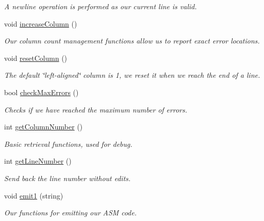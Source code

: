 \begin{DoxyCompactItemize}
\begin{DoxyCompactList}\small\item\em A newline operation is performed as our current line is valid. \item\end{DoxyCompactList}\item 
void \hyperlink{classAdmin_a89653dd68c51b51d9003a2518a56175f}{increaseColumn} ()
\begin{DoxyCompactList}\small\item\em Our column count management functions allow us to report exact error locations. \item\end{DoxyCompactList}\item 
void \hyperlink{classAdmin_a62813e5c17636eeef43524ad40cdaab8}{resetColumn} ()
\begin{DoxyCompactList}\small\item\em The default \char`\"{}left-\/aligned\char`\"{} column is 1, we reset it when we reach the end of a line. \item\end{DoxyCompactList}\item 
bool \hyperlink{classAdmin_af5cd211ee7891ec1fec719bace4b678b}{checkMaxErrors} ()
\begin{DoxyCompactList}\small\item\em Checks if we have reached the maximum number of errors. \item\end{DoxyCompactList}\item 
int \hyperlink{classAdmin_a576e2dfe10f528ad5f1816e673ed2e32}{getColumnNumber} ()
\begin{DoxyCompactList}\small\item\em Basic retrieval functions, used for debug. \item\end{DoxyCompactList}\item 
int \hyperlink{classAdmin_a1a33282a2d64fa3dd9b3e8ac1a4799e3}{getLineNumber} ()
\begin{DoxyCompactList}\small\item\em Send back the line number without edits. \item\end{DoxyCompactList}\item 
void \hyperlink{classAdmin_a8518362526e301c8ccd26eeff689b862}{emit1} (string)
\begin{DoxyCompactList}\small\item\em Our functions for emitting our ASM code. \item\end{DoxyCompactList}\item 

\end{DoxyCompactItemize}
